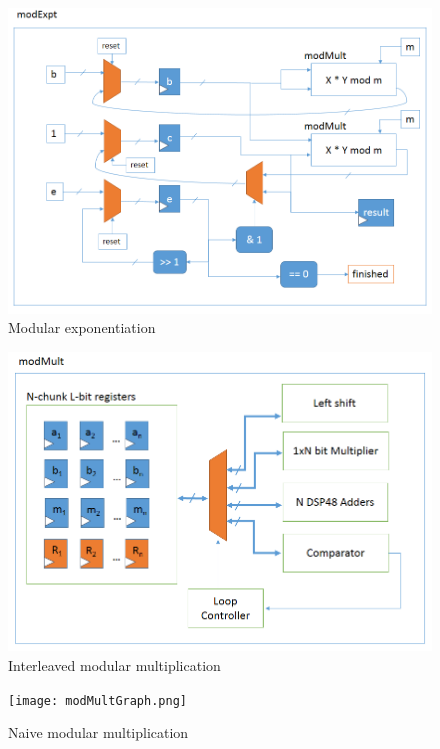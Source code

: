 \documentclass[12pt]{article}
\begin{document}
\begin{figure}
  \begin{centering}
    \includegraphics[width=\textwidth]{modexpt.png}
    \caption{Modular exponentiation}
    \label{fig-expt}
  \end{centering}
\end{figure}

\begin{figure}
  \begin{centering}
    \includegraphics[width=\textwidth]{modmult.png}
    \caption{Interleaved modular multiplication}
    \label{fig-inter}
  \end{centering}
\end{figure}

\begin{figure}
  \begin{centering}
    \texttt{[image: modMultGraph.png]}
    \caption{Naive modular multiplication}
    \label{fig-naive}
  \end{centering}
\end{figure}
\end{document}
